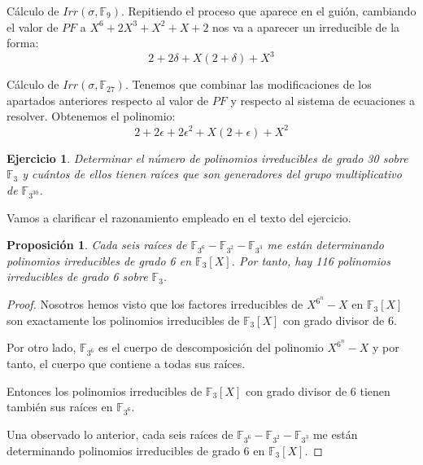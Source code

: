 \documentclass{article}
\theoremstyle{theorem-style}  %
\newtheorem{proposition}[theorem]{Proposición}
\theoremstyle{definition-style}
\theoremstyle{example-style}
\newtheorem{exercise}{Ejercicio}[section]
\begin{document}
Cálculo de $Irr(\sigma,\mathbb{F}_9)$. Repitiendo el proceso que aparece en el guión, cambiando el valor de $PF$ a $X^6+2X^3+X^2+X+2$ nos va a aparecer un irreducible de la forma: $$2 + 2 \delta + X (2 + \delta) + X^3$$ 

Cálculo de $Irr(\sigma,\mathbb{F}_{27})$. Tenemos que combinar las modificaciones de los apartados anteriores respecto al valor de $PF$ y respecto al sistema de ecuaciones a resolver. Obtenemos el polinomio: $$2 + 2 \epsilon + 2 \epsilon^2 + X (2 + \epsilon) + X^2$$

\begin{exercise}
	Determinar el número de polinomios irreducibles de grado 30 sobre $\mathbb{F}_3$ y cuántos de ellos tienen raíces que son generadores del grupo multiplicativo de $\mathbb{F}_{3^{30}}$.
\end{exercise}

Vamos a clarificar el razonamiento empleado en el texto del ejercicio.

\begin{proposition}
	Cada seis raíces de $\mathbb{F}_{3^6} - \mathbb{F}_{3^2} - \mathbb{F}_{3^3}$ me están determinando polinomios irreducibles de grado 6 en $\mathbb{F}_3[X]$. Por tanto, hay 116 polinomios irreducibles de grado 6 sobre $\mathbb{F}_3$.
\end{proposition}
\begin{proof}
Nosotros hemos visto que los factores irreducibles de $X^{6^n} - X$ en $\mathbb{F}_3[X]$ son exactamente los polinomios irreducibles de $\mathbb{F}_3[X]$ con grado divisor de $6$. 

Por otro lado, $\mathbb{F}_{3^6}$ es el cuerpo de descomposición del polinomio $X^{6^n} - X$ y por tanto, el cuerpo que contiene a todas sus raíces. 

Entonces los polinomios irreducibles de $\mathbb{F}_3[X]$ con grado divisor de $6$ tienen también sus raíces en $\mathbb{F}_{3^6}$. 

Una observado lo anterior, cada seis raíces de $\mathbb{F}_{3^6} - \mathbb{F}_{3^2} - \mathbb{F}_{3^3}$ me están determinando polinomios irreducibles de grado 6 en $\mathbb{F}_3[X]$. 
\end{proof}
\end{document}
